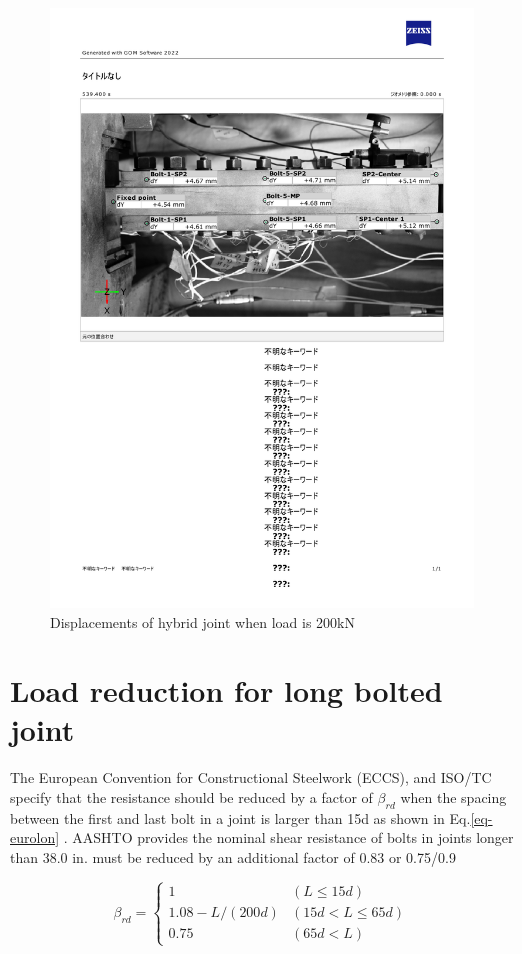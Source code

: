 \begin{figure}
    \centering
    \includegraphics[width=0.85\linewidth]{imgs/ch6/dic-B3-200kN.pdf}
    \caption{Displacements of hybrid joint when load is 200kN }
    \label{fig-dicdisp}
\end{figure}

\section{Load reduction for long bolted joint}

The European Convention for Constructional Steelwork (ECCS), and ISO/TC specify that the resistance should be reduced by a factor of $\beta_{rd}$ when the spacing between the first and last bolt in a joint is larger than 15d as shown in Eq.\ref{eq-eurolon} \cite{eccs1985,isohtb}. AASHTO \cite{AASHTO2020} provides the nominal shear resistance of bolts in joints longer than 38.0 in. must be reduced by an additional factor of 0.83 or 0.75/0.9\par

\begin{equation}\label{eq-eurolon}
    \beta_{rd} = 
    \begin{cases}
    1 & (L \leq 15 d) \\ 
    1.08-L / (200 d) & (15 d < L \leq 65 d)\\ 
    0.75 & (65 d < L)
    \end{cases}
\end{equation}

